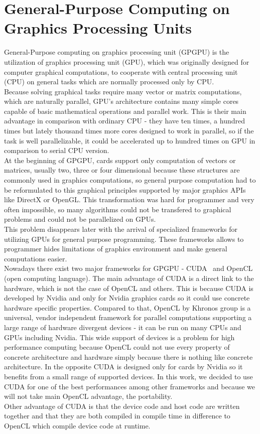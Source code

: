 \chapter{General-Purpose Computing on Graphics Processing Units}
General-Purpose computing on graphics processing unit (GPGPU) is the utilization of graphics processing unit (GPU), which was originally designed for computer graphical computations, to cooperate with central processing unit (CPU) on general tasks which are normally processed only by CPU.\\
Because solving graphical tasks require many vector or matrix computations, which are naturally parallel, GPU's architecture contains many simple cores capable of basic mathematical operations and parallel work. This is their main advantage in comparison with ordinary CPU - they have ten times, a hundred times but lately thousand times more cores designed to work in parallel, so if the task is well parallelizable, it could be accelerated up to hundred times on GPU in comparison to serial CPU version.\\
At the beginning of GPGPU, cards support only computation of vectors or matrices, usually two, three or four dimensional because these structures are commonly used in graphics computations, so general purpose computation had to be reformulated to this graphical principles supported by major graphics APIs like DirectX or OpenGL. This transformation was hard for programmer and very often impossible, so many algorithms could not be transfered to graphical problems and could not be parallelized on GPUs.\\
This problem disappears later with the arrival of specialized frameworks for utilizing GPUs for general purpose programming. These frameworks allows to programmer hides limitations of graphics environment and make general computations easier.~\cite{Kirk12}\\
Nowadays there exist two major frameworks for GPGPU - CUDA~\cite{Sanders10} and OpenCL~\cite{Scarpino11} (open computing language). The main advantage of CUDA is a direct link to the hardware, which is not the case of OpenCL and others. This is because CUDA is developed by Nvidia and only for Nvidia graphics cards so it could use concrete hardware specific properties. Compared to that, OpenCL by Khronos group is a universal, vendor independent framework for parallel computations supporting a large range of hardware divergent devices - it can be run on many CPUs and GPUs including Nvidia. This wide support of devices is a problem for high performance computing because OpenCL could not use every property of concrete architecture and hardware simply because there is nothing like concrete architecture. In the opposite CUDA is designed only for cards by Nvidia so it benefits from a small range of supported devices. In this work, we decided to use CUDA for one of the best performances among other frameworks and because we will not take main OpenCL advantage, the portability.\\
Other advantage of CUDA is that the device code and host code are written together and that they are both compiled in compile time in difference to OpenCL which compile device code at runtime.

